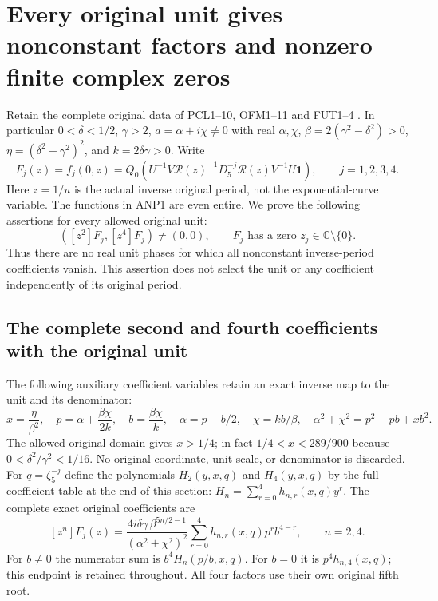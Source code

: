 \documentclass[11pt]{article}
\begin{document}
\section{Every original unit gives nonconstant factors and nonzero finite complex zeros}
Retain the complete original data of PCL1--10, OFM1--11 and FUT1--4
\cite{PCLOriginal,NC,Cumulative,PeriodZeroOriginal}. In particular
$0<\delta<1/2$, $\gamma>2$, $a=\alpha+i\chi\ne0$ with real
$\alpha,\chi$, $\beta=2(\gamma^2-\delta^2)>0$,
$\eta=(\delta^2+\gamma^2)^2$, and $k=2\delta\gamma>0$.
Write
\[
 F_j(z)=f_j(0,z)
 =Q_0\!\left(U^{-1}V\mathcal R(z)^{-1}D_5^{-j}
                  \mathcal R(z)V^{-1}U\boldsymbol1\right),
 \qquad j=1,2,3,4.
 \tag{ANP1}
\]
Here $z=1/u$ is the actual inverse original period, not the
exponential-curve variable. The functions in ANP1 are even entire.
We prove the following assertions for every allowed original unit:
\[
 \boxed{\quad
 ([z^2]F_j,[z^4]F_j)\ne(0,0),\qquad
 F_j\text{ has a zero }z_j\in\mathbb C\setminus\{0\}.
 \quad}\tag{ANP2}
\]
Thus there are no real unit phases for which all nonconstant
inverse-period coefficients vanish. This assertion does not select
the unit or any coefficient independently of its original period.

\subsection{The complete second and fourth coefficients with the original unit}
The following auxiliary coefficient variables retain an exact inverse
map to the unit and its denominator:
\[
 x=\frac\eta{\beta^2},\quad
 p=\alpha+\frac{\beta\chi}{2k},\quad b=\frac{\beta\chi}{k},
 \quad
 \alpha=p-b/2,\quad\chi=kb/\beta,\quad
 \alpha^2+\chi^2=p^2-pb+xb^2.
 \tag{ANP3}
\]
The allowed original domain gives $x>1/4$; in fact
$1/4<x<289/900$ because $0<\delta^2/\gamma^2<1/16$.
No original coordinate, unit scale, or denominator is discarded.
For $q=\zeta_5^{-j}$ define the polynomials $H_2(y,x,q)$ and
$H_4(y,x,q)$ by the full coefficient table at the end of this section:
$H_n=\sum_{r=0}^4h_{n,r}(x,q)y^r$.
The complete exact original coefficients are
\[
 \boxed{\quad
 [z^n]F_j(z)=
 \frac{4i\delta\gamma\,\beta^{5n/2-1}}
      {(\alpha^2+\chi^2)^2}
       \sum_{r=0}^4h_{n,r}(x,q)p^rb^{4-r},
       \qquad n=2,4.
 \quad}\tag{ANP4}
\]
For $b\ne0$ the numerator sum is $b^4H_n(p/b,x,q)$.
For $b=0$ it is $p^4h_{n,4}(x,q)$; this endpoint is retained
throughout. All four factors use their own original fifth root.
\end{document}
